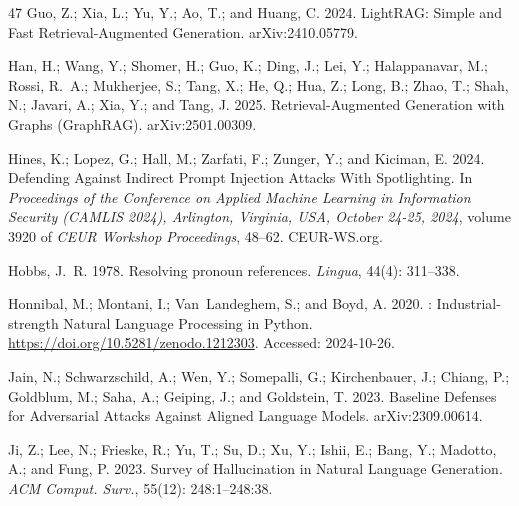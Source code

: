 \documentclass[letterpaper]{article} %
\begin{document}
\begin{thebibliography}{47}
    Guo, Z.; Xia, L.; Yu, Y.; Ao, T.; and Huang, C. 2024.
    \newblock LightRAG: Simple and Fast Retrieval-Augmented Generation.
    \newblock arXiv:2410.05779.
    
    Han, H.; Wang, Y.; Shomer, H.; Guo, K.; Ding, J.; Lei, Y.; Halappanavar, M.; Rossi, R.~A.; Mukherjee, S.; Tang, X.; He, Q.; Hua, Z.; Long, B.; Zhao, T.; Shah, N.; Javari, A.; Xia, Y.; and Tang, J. 2025.
    \newblock Retrieval-Augmented Generation with Graphs (GraphRAG).
    \newblock arXiv:2501.00309.
    
    Hines, K.; Lopez, G.; Hall, M.; Zarfati, F.; Zunger, Y.; and Kiciman, E. 2024.
    \newblock Defending Against Indirect Prompt Injection Attacks With Spotlighting.
    \newblock In \emph{Proceedings of the Conference on Applied Machine Learning in Information Security {(CAMLIS} 2024), Arlington, Virginia, USA, October 24-25, 2024}, volume 3920 of \emph{{CEUR} Workshop Proceedings}, 48--62. CEUR-WS.org.
    
    Hobbs, J.~R. 1978.
    \newblock Resolving pronoun references.
    \newblock \emph{Lingua}, 44(4): 311--338.
    
    Honnibal, M.; Montani, I.; Van~Landeghem, S.; and Boyd, A. 2020.
    : Industrial-strength Natural Language Processing in {Python}.
    \newblock \url{https://doi.org/10.5281/zenodo.1212303}.
    \newblock Accessed: 2024-10-26.
    
    Jain, N.; Schwarzschild, A.; Wen, Y.; Somepalli, G.; Kirchenbauer, J.; Chiang, P.; Goldblum, M.; Saha, A.; Geiping, J.; and Goldstein, T. 2023.
    \newblock Baseline Defenses for Adversarial Attacks Against Aligned Language Models.
    \newblock arXiv:2309.00614.
    
    Ji, Z.; Lee, N.; Frieske, R.; Yu, T.; Su, D.; Xu, Y.; Ishii, E.; Bang, Y.; Madotto, A.; and Fung, P. 2023.
    \newblock Survey of Hallucination in Natural Language Generation.
    \newblock \emph{{ACM} Comput. Surv.}, 55(12): 248:1--248:38.
    

\end{thebibliography}
\end{document}
